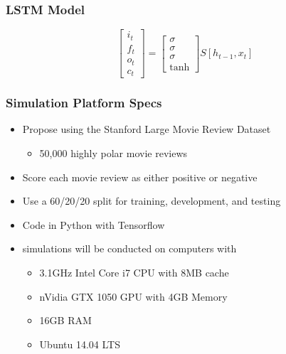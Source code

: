 \documentclass{beamer}
\begin{document}
\begin{frame}
\frametitle{LSTM Model}
    $$
    \begin{bmatrix} 
    i_t\\f_t\\o_t\\c_t 
    \end{bmatrix} = 
    \begin{bmatrix}
    \sigma\\\sigma\\\sigma\\\tanh
    \end{bmatrix}
    S[h_{t-1},x_t]
    $$
\end{frame}

\begin{frame}
\frametitle{Simulation Platform Specs}
    \begin{itemize}
        \item Propose using the Stanford Large Movie Review Dataset
        \begin{itemize}
            \item 50,000 highly polar movie reviews
        \end{itemize}
        \item Score each movie review as either positive or negative
        \item Use a 60/20/20 split for training, development, and testing
        \item Code in Python with Tensorflow
        \item simulations will be conducted on computers with 
        \begin{itemize}
            \item 3.1GHz Intel Core i7 CPU with 8MB cache
            \item nVidia GTX 1050 GPU with 4GB Memory
            \item 16GB RAM
            \item Ubuntu 14.04 LTS
        \end{itemize}
    \end{itemize}
\end{frame}
\end{document}
